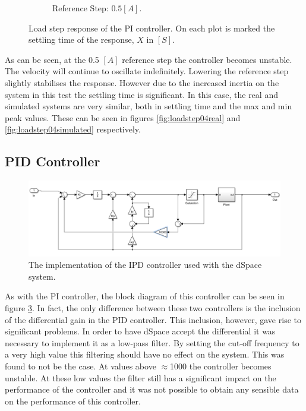 \begin{figure}
\begin{subfigure}[t]{.49\linewidth}
		\caption{Reference Step: $0.5 [A]$.}
		\label{fig:}
	\end{subfigure}
	\caption[Load step response of PI controller]{Load step response of the PI controller. On each plot is marked the settling time of the response, $X$ in $[S]$.}
	\label{fig:loadstep}
\end{figure}

As can be seen, at the 0.5 $[A]$ reference step the controller becomes unstable.
The velocity will continue to oscillate indefinitely.
Lowering the reference step slightly stabilises the response.
However due to the increased inertia on the system in this test the settling time is significant.
In this case, the real and simulated systems are very similar, both in settling time and the max and min peak values.
These can be seen in figures \ref{fig:loadstep04real} and \ref{fig:loadstep04simulated} respectively.

\subsection{PID Controller}

\begin{figure}[!h]
	\centering
	\includegraphics[width=.75\linewidth]{graphics/ipd_controller}
	\caption{The implementation of the IPD controller used with the dSpace system.}
	\label{fig:ipdcontroller}
\end{figure}

As with the PI controller, the block diagram of this controller can be seen in figure \ref{fig:ipdcontroller}.
In fact, the only difference between these two controllers is the inclusion of the differential gain in the PID controller.
This inclusion, however, gave rise to significant problems.
In order to have dSpace accept the differential it was necessary to implement it as a low-pass filter.
By setting the cut-off frequency to a very high value this filtering should have no effect on the system.
This was found to not be the case. 
At values above $\approx$1000 the controller becomes unstable.
At these low values the filter still has a significant impact on the performance of the controller and it was not possible to obtain any sensible data on the performance of this controller.

